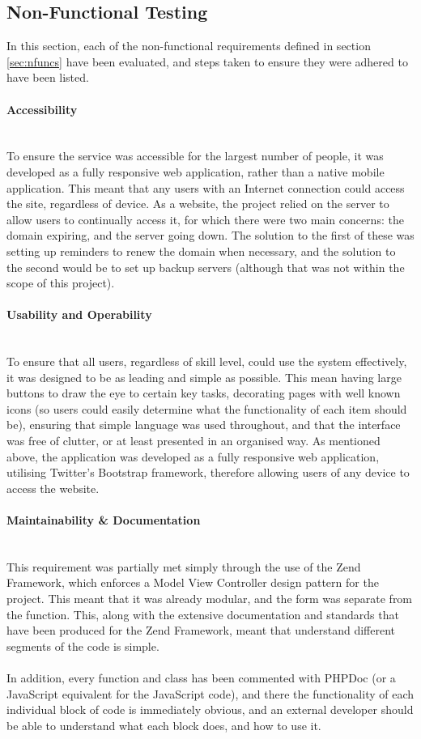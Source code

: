 \newpage 
\subsection{Non-Functional Testing}
In this section, each of the non-functional requirements defined in section \ref{sec:nfuncs} have been evaluated, and steps taken to ensure they were adhered to have been listed.


\paragraph{Accessibility}\ \\
To ensure the service was accessible for the largest number of people, it was developed as a fully responsive web application, rather than a native mobile application. This meant that any users with an Internet connection could access the site, regardless of device. As a website, the project relied on the server to allow users to continually access it, for which there were two main concerns: the domain expiring, and the server going down. The solution to the first of these was setting up reminders to renew the domain when necessary, and the solution to the second would be to set up backup servers (although that was not within the scope of this project).

\paragraph{Usability and Operability}\ \\
To ensure that all users, regardless of skill level, could use the system effectively, it was designed to be as leading and simple as possible. This mean having large buttons to draw the eye to certain key tasks, decorating pages with well known icons (so users could easily determine what the functionality of each item should be), ensuring that simple language was used throughout, and that the interface was free of clutter, or at least presented in an organised way. As mentioned above, the application was developed as a fully responsive web application, utilising Twitter's Bootstrap framework, therefore allowing users of any device to access the website.

\paragraph{Maintainability \& Documentation}\ \\
This requirement was partially met simply through the use of the Zend Framework, which enforces a Model View Controller design pattern for the project. This meant that it was already modular, and the form was separate from the function. This, along with the extensive documentation and standards that have been produced for the Zend Framework, meant that understand different segments of the code is simple.\ \\
\ \\
In addition, every function and class has been commented with PHPDoc (or a JavaScript equivalent for the JavaScript code), and there the functionality of each individual block of code is immediately obvious, and an external developer should be able to understand what each block does, and how to use it.

